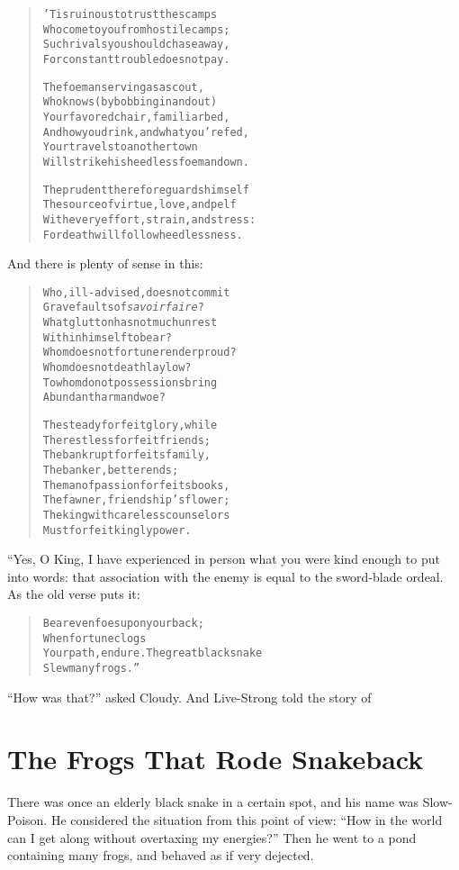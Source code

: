 \documentclass[article, twoside, 10pt]{memoir}
\renewenvironment{verbatim}{%
\begin{quote}%
\vskip -10pt%
\begin{alltt}\normalfont\small}{\end{alltt}%
\end{quote}%
\vskip -10pt
} %
\begin{document}
\begin{verbatim}
'Tis ruinous to trust the scamps
Who come to you from hostile camps;
Such rivals you should chase away,
For constant trouble does not pay.

The foeman serving as a scout,
Who knows (by bobbing in and out)
Your favored chair, familiar bed,
And how you drink, and what you're fed,
Your travels to another town{\textemdash}
Will strike his heedless foeman down.

The prudent therefore guards himself{\textemdash}
The source of virtue, love, and pelf{\textemdash}
With every effort, strain, and stress:
For death will follow heedlessness.
\end{verbatim}
And there is plenty of sense in this:

\begin{verbatim}
Who, ill-advised, does not commit
    Grave faults of \emph{savoir faire}?
What glutton has not much unrest
    Within himself to bear?
Whom does not fortune render proud?
    Whom does not death lay low?
To whom do not possessions bring
    Abundant harm and woe?

The steady forfeit glory, while
    The restless forfeit friends;
The bankrupt forfeits family,
    The banker, better ends;
The man of passion forfeits books,
    The fawner, friendship's flower;
The king with careless counselors
    Must forfeit kingly power.
\end{verbatim}
“Yes, O King, I have experienced in person what you were kind
enough to put into words: that association with the enemy is equal
to the sword-blade ordeal. As the old verse puts it:

\begin{verbatim}
Bear even foes upon your back;
    When fortune clogs
Your path, endure. The great black snake
    Slew many frogs.”
\end{verbatim}
``How was that?'' asked Cloudy. And Live-Strong told the story of

\chapter{The Frogs That Rode Snakeback}

There was once an elderly black snake in a certain spot, and his
name was Slow-Poison. He considered the situation from this point
of view:
``How in the world can I get along without overtaxing my energies?''
Then he went to a pond containing many frogs, and behaved as if
very dejected.
\end{document}
